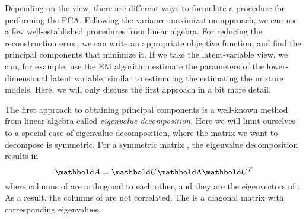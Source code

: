 Depending on the view,
there are different ways to formulate a procedure for performing the PCA.
Following the variance-maximization approach,
we can use a few well-established procedures from linear algebra.
For reducing the reconstruction error,
we can write an appropriate objective function,
and find the principal components that minimize it.
If we take the latent-variable view,
we can, for example, use the EM algorithm estimate
the parameters of the lower-dimensional latent variable,
similar to estimating the estimating the mixture models.
Here,
we will only discuss the first approach in a bit more detail.

The first approach to obtaining principal components is
a well-known method from linear algebra called
\emph{eigenvalue decomposition}.
Here we will limit ourselves to a special case of eigenvalue decomposition,
where the matrix we want to decompose is symmetric.
For a symmetric matrix ,
the eigenvalue decomposition results in 
\[
  \vect{A} = \vect{U}\vect{\Lambda}\vect{U}^{T}
\]
where columns of  are orthogonal to each other,
and they are the eigenvectors of .
As a result, the columns of  are not correlated.%
The \vect{\Lambda} is a diagonal matrix with corresponding eigenvalues.

